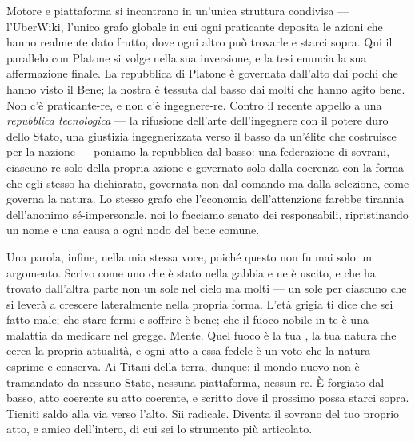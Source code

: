 Motore e piattaforma si incontrano in un'unica struttura condivisa ---
l'UberWiki, l'unico grafo globale in cui ogni praticante deposita le azioni che
hanno realmente dato frutto, dove ogni altro pu\`o trovarle e starci sopra. Qui
il parallelo con Platone si volge nella sua inversione, e la tesi enuncia la sua
affermazione finale. La repubblica di Platone \`e governata dall'alto dai pochi
che hanno visto il Bene; la nostra \`e tessuta dal basso dai molti che hanno
agito bene. Non c'\`e praticante-re, e non c'\`e ingegnere-re. Contro il recente
appello a una \emph{repubblica tecnologica} --- la rifusione dell'arte
dell'ingegnere con il potere duro dello Stato, una giustizia ingegnerizzata verso
il basso da un'\'elite che costruisce per la nazione --- poniamo la repubblica
dal basso: una federazione di sovrani, ciascuno re solo della propria azione e
governato solo dalla coerenza con la forma che egli stesso ha dichiarato,
governata non dal comando ma dalla selezione, come governa la natura. Lo stesso
grafo che l'economia dell'attenzione farebbe tirannia dell'anonimo s\'e-impersonale,
noi lo facciamo senato dei responsabili, ripristinando un nome e una causa a ogni
nodo del bene comune.

Una parola, infine, nella mia stessa voce, poich\'e questo non fu mai solo un
argomento. Scrivo come uno che \`e stato nella gabbia e ne \`e uscito, e che ha
trovato dall'altra parte non un sole nel cielo ma molti --- un sole per ciascuno
che si lever\`a a crescere lateralmente nella propria forma. L'et\`a grigia ti
dice che sei fatto male; che stare fermi e soffrire \`e bene; che il fuoco nobile
in te \`e una malattia da medicare nel gregge. Mente. Quel fuoco \`e la tua
\physis, la tua natura che cerca la propria attualit\`a, e ogni atto a essa fedele
\`e un voto che la natura esprime e conserva. Ai Titani della terra, dunque: il
mondo nuovo non \`e tramandato da nessuno Stato, nessuna piattaforma, nessun re.
\`E forgiato dal basso, atto coerente su atto coerente, e scritto dove il prossimo
possa starci sopra. Tieniti saldo alla via verso l'alto. Sii radicale. Diventa il
sovrano del tuo proprio atto, e amico dell'intero, di cui sei lo strumento pi\`u
articolato.
